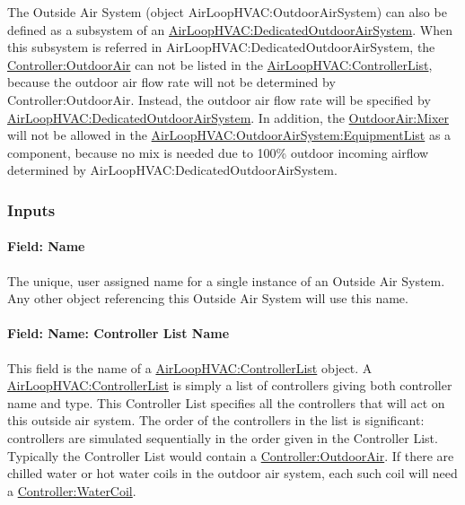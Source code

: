 The Outside Air System (object AirLoopHVAC:OutdoorAirSystem) can also be defined as a subsystem of an \hyperref[airloophvacdedicatedoutdoorairsystem]{AirLoopHVAC:DedicatedOutdoorAirSystem}. When this subsystem is referred in AirLoopHVAC:DedicatedOutdoorAirSystem, the \hyperref[controlleroutdoorair]{Controller:OutdoorAir} can not be listed in the \hyperref[airloophvaccontrollerlist]{AirLoopHVAC:ControllerList}, because the outdoor air flow rate will not be determined by Controller:OutdoorAir. Instead, the outdoor air flow rate will be specified by \hyperref[airloophvacdedicatedoutdoorairsystem]{AirLoopHVAC:DedicatedOutdoorAirSystem}.  In addition, the \hyperref[outdoorairmixer]{OutdoorAir:Mixer} will not be allowed in the \hyperref[airloophvacoutdoorairsystemequipmentlist]{AirLoopHVAC:OutdoorAirSystem:EquipmentList} as a component, because no mix is needed due to 100\% outdoor incoming airflow determined by AirLoopHVAC:DedicatedOutdoorAirSystem.

\subsubsection{Inputs}\label{inputs-3-001}

\paragraph{Field: Name}\label{field-name-3-001}

The unique, user assigned name for a single instance of an Outside Air System. Any other object referencing this Outside Air System will use this name.

\paragraph{Field: Name: Controller List Name}\label{field-name-controller-list-name}

This field is the name of a \hyperref[airloophvaccontrollerlist]{AirLoopHVAC:ControllerList} object. A \hyperref[airloophvaccontrollerlist]{AirLoopHVAC:ControllerList} is simply a list of controllers giving both controller name and type. This Controller List specifies all the controllers that will act on this outside air system. The order of the controllers in the list is significant: controllers are simulated sequentially in the order given in the Controller List. Typically the Controller List would contain a \hyperref[controlleroutdoorair]{Controller:OutdoorAir}. If there are chilled water or hot water coils in the outdoor air system, each such coil will need a \hyperref[controllerwatercoil]{Controller:WaterCoil}.


